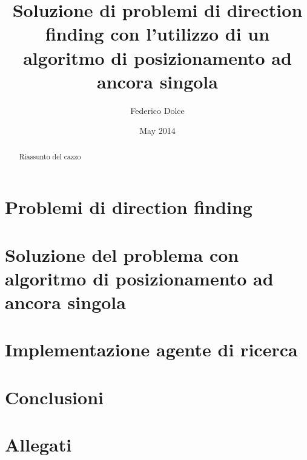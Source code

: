 \documentclass{report}
\begin{document}
\frontmatter
\title{Soluzione di problemi di direction finding con l'utilizzo di un algoritmo di posizionamento ad ancora singola}
\author{Federico Dolce}
\date{May 2014}
\maketitle
\begin{abstract}
Riassunto del cazzo
\end{abstract}
\tableofcontents
\mainmatter

\chapter{Problemi di direction finding}
	

\chapter{Soluzione del problema con algoritmo di posizionamento ad ancora singola}
	


\chapter{Implementazione agente di ricerca}
	

\chapter{Conclusioni}
	

\appendix
\chapter{Allegati}
	
	
\end{document}

